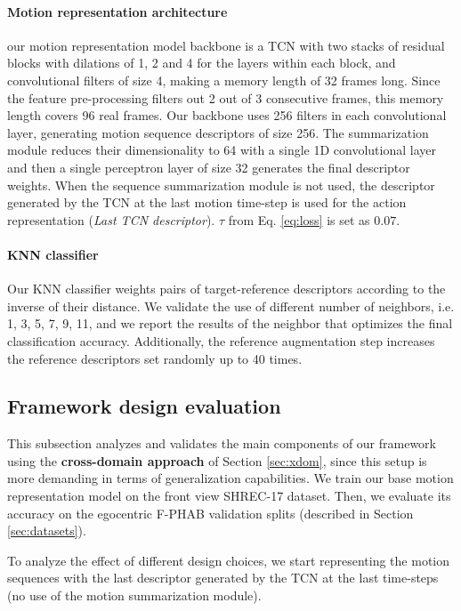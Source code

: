 \documentclass[letterpaper, 10 pt, conference]{ieeeconf}
\begin{document}
\paragraph*{Motion representation architecture}
our motion representation model backbone is a TCN with two stacks of residual blocks with dilations of 1, 2 and 4 for the layers within each block,
and convolutional filters of size 4, making a memory length of 32 frames long. Since the feature pre-processing filters out 2 out of 3 consecutive frames, this memory length covers 96 real frames.
Our backbone uses 256 filters in each convolutional layer, generating motion sequence descriptors of size 256. The summarization module reduces their dimensionality to 64 with a single 1D convolutional layer and then a single perceptron layer of size 32 generates the final descriptor weights. 
When the sequence summarization module is not used, the descriptor generated by the TCN at the last motion time-step is used for the action representation (\textit{Last TCN descriptor}). 
$\tau$ from Eq. \ref{eq:loss} is set as $0.07$.

\paragraph*{KNN classifier}
Our KNN classifier weights pairs of target-reference descriptors according to the inverse of their distance.
We validate the use of different number of neighbors,  i.e. 1, 3, 5, 7, 9, 11, and we report the results of the neighbor that optimizes the final classification accuracy. Additionally, the reference augmentation step increases the reference descriptors set randomly up to 40 times.




\subsection{Framework design evaluation}

This subsection analyzes and validates the main components of our framework using the \textbf{cross-domain approach} of Section \ref{sec:xdom}, since this setup is more demanding in terms of generalization capabilities.
We train our base motion representation model on the front view SHREC-17 dataset.
Then, we evaluate its accuracy on the egocentric F-PHAB validation splits (described in Section \ref{sec:datasets}).

To analyze the effect of different design choices, we start representing the motion sequences with the last descriptor generated by the TCN at the last time-steps (no use of the motion summarization module).
\end{document}
